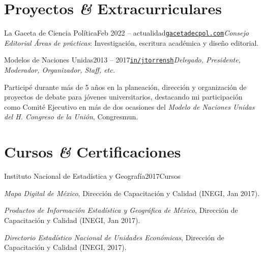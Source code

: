 \documentclass[letter]{resume}
\begin{document}
\section{Proyectos \textbf{\em\&} Extracurriculares}

\begin{content}
\begin{position}{La Gaceta de Ciencia Política}{Feb 2022 -- actualidad}{\normalfont\href{https://gacetadecpol.com/}{\texttt{gacetadecpol.com}}}{\emph{Consejo Editorial}}{}
  {\emph{Áreas de prácticas}}: Investigación, escritura académica y diseño editorial.
\end{position}

\begin{position}{Modelos de Naciones Unidas}{2013 -- 2017}{\normalfont\href{https://www.linkedin.com/in/jtorrensh/}{\texttt{in/jtorrensh}}}{\emph{Delegado, Presidente, Moderador, Organizador, Staff, etc.}}{}
  \item Participé durante más de 5 años en la planeación, dirección y organización de proyectos de debate para jóvenes universitarios, destacando mi participación como Comité Ejecutivo en más de dos ocasiones del \emph{Modelo de Naciones Unidas del H. Congreso de la Unión}, Congresmun.

\end{position}

\sectionlineskip
\end{content}


\section{Cursos \textbf{\em\&} Certificaciones}

\begin{content}
\begin{position}{Instituto Nacional de Estadística y Geografía}{2017}{Cursos}{}{}
\item \emph{Mapa Digital de México}, Dirección de Capacitación y Calidad (INEGI, Jan 2017).
\item \emph{Productos de Información Estadística y Geográfica de México}, Dirección de Capacitación y Calidad (INEGI, Jan 2017).
\item \emph{Directorio Estadístico Nacional de Unidades Económicas}, Dirección de Capacitación y Calidad (INEGI, 2017).
\end{position}
\end{content}
\end{document}
